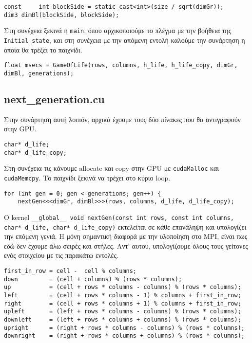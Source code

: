 \begin{tcolorbox}
\begin{verbatim}
const     int blockSide = static_cast<int>(size / sqrt(dimGr));
dim3 dimBl(blockSide, blockSide);
\end{verbatim}
\end{tcolorbox}

Στη συνέχεια ξεκινά η \texttt{main}, όπου αρχικοποιούμε το πλέγμα με την βοήθεια της \texttt{Initial_state}, και στη συνέχεια με την απόμενη εντολή καλούμε την συνάρτηση η οποία θα τρέξει το παιχνίδι.

\begin{tcolorbox}
\texttt{float msecs = GameOfLife(rows, columns, h_life, h_life_copy, dimGr, dimBl, generations);}
\end{tcolorbox}

\subsection{next\_generation.cu}
Στην συνάρτηση αυτή λοιπόν, αρχικά έχουμε τους δύο πίνακες που θα αντιγραφούν στην GPU.

\begin{tcolorbox}
\begin{verbatim}
char* d_life;
char* d_life_copy;
\end{verbatim}
\end{tcolorbox}

Στη συνέχεια τις κάνουμε allocate και copy στην GPU με \texttt{cudaMalloc} και \texttt{cudaMemcpy}. Το παιχνίδι ξεκινά να τρέχει στο κύριο loop.

\begin{tcolorbox}
\begin{verbatim}
for (int gen = 0; gen < generations; gen++) {
    nextGen<<<dimGr, dimBl>>>(rows, columns, d_life, d_life_copy);
\end{verbatim}
\end{tcolorbox}

Ο kernel \texttt{__global__ void nextGen(const int rows, const int columns, char* d_life, char* d_life_copy)} εκτελείται σε κάθε επανάληψη και υπολογίζει την επόμενη γενιά. Η μόνη σημαντική διαφορά με την υλοποίηση στο MPI, είναι πως εδώ δεν έχουμε άλω σειρές και στήλες. Αντ' αυτού, υπολογίζουμε όλους τους γείτονες ενός στοιχείου με τις παρακάτω εντολές.

\begin{tcolorbox}
\begin{verbatim}
first_in_row = cell -  cell % columns;
down         = (cell + columns) % (rows * columns);
up           = (cell + rows * columns - columns) % (rows * columns);
left         = (cell + rows * columns - 1) % columns + first_in_row;
right        = (cell + rows * columns + 1) % columns + first_in_row;
upleft       = (left + rows * columns - columns) % (rows * columns);
downleft     = (left + rows * columns + columns) % (rows * columns);
upright      = (right + rows * columns - columns) % (rows * columns);
downright    = (right + rows * columns + columns) % (rows * columns);
\end{verbatim}
\end{tcolorbox}

